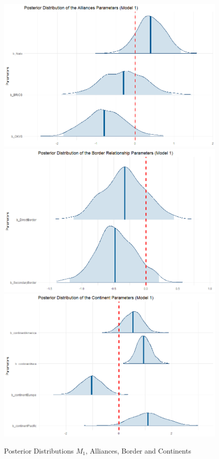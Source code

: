 \documentclass[12pt,a4paper]{article}
\begin{document}
\begin{figure}[h]
\center
\label{F:4}
\includegraphics[scale=0.2]{PosteriorPlot_Alliances_Model1.png}
\includegraphics[scale=0.2]{PosteriorPlot_Border_Model1.png}
\includegraphics[scale=0.2]{PosteriorPlot_Continents_Model1.png}
\caption{Posterior Distributions $M_1$, Alliances, Border and Continents}
\end{figure}
\end{document}
